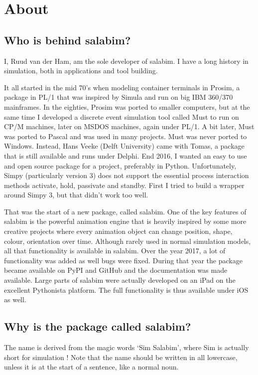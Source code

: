 \documentclass[letterpaper,10pt,english]{sphinxmanual}
\begin{document}
\chapter{About}
\label{\detokenize{About::doc}}\label{\detokenize{About:about}}

\section{Who is behind salabim?}
\label{\detokenize{About:who-is-behind-salabim}}
I, Ruud van der Ham, am the sole developer of salabim. I have a long history in simulation, both in
applications and tool building.

It all started in the mid 70’s when modeling container terminals in Prosim, a package
in PL/1 that was inspired by Simula and run on big IBM 360/370 mainframes. 
In the eighties, Prosim was ported to smaller computers, but at the same time I
developed a discrete event simulation tool called Must to run on CP/M machines, later
on MSDOS machines, again under PL/1. A bit later, Must was ported to Pascal and was
used in many projects. Must was never ported to Windows. Instead, Hans Veeke (Delft University)
came with Tomas, a package that is still available and runs under Delphi. 
End 2016, I wanted an easy to use and open source package for a project, preferably
in Python. Unfortunately, Simpy (particularly version 3) does not support the essential
process interaction methods activate, hold, passivate and standby. First I tried to
build a wrapper around Simpy 3, but that didn’t work too well.

That was the start of a new package, called salabim.
One of the key features of salabim is the powerful animation engine that is heavily
inspired by some more creative projects where every animation object can change position,
shape, colour, orientation over time. Although rarely used in normal simulation models,
all that functionality is available in salabim. 
Over the year 2017, a lot of functionality was added as well bugs were fixed. During that year
the package became available on PyPI and GitHub and the documentation was made available. 
Large parts of salabim were actually developed on an iPad on the excellent Pythonista platform. The full
functionality is thus available under iOS as well.


\section{Why is the package called salabim?}
\label{\detokenize{About:why-is-the-package-called-salabim}}
The name is derived from the magic words ‘Sim Salabim’,
where Sim is actually short for simulation !
Note that the name should be written in all lowercase, unless it is at the start of a sentence, like a
normal noun.
\end{document}
